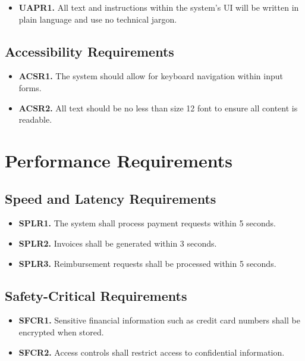\documentclass[12pt]{article}
\begin{document}
\begin{itemize}
    \item \textbf{UAPR1.} All text and instructions within the system's UI will be written in plain language and use no technical jargon.
\end{itemize}

\subsection{Accessibility Requirements}

\label{ACSR}

\begin{itemize}
    \item \textbf{ACSR1.} The system should allow for keyboard navigation within input forms.
    \item \textbf{ACSR2.} All text should be no less than size 12 font to ensure all content is readable.
\end{itemize}

\section{Performance Requirements}
\subsection{Speed and Latency Requirements}

\label{SPLR}

\begin{itemize}
    \item \textbf{SPLR1.} The system shall process payment requests within 5 seconds.
    \item \textbf{SPLR2.} Invoices shall be generated within 3 seconds.
    \item \textbf{SPLR3.} Reimbursement requests shall be processed within 5 seconds.
\end{itemize}

\subsection{Safety-Critical Requirements}

\label{SFCR}

\begin{itemize}
    \item \textbf{SFCR1.} Sensitive financial information such as credit card numbers shall be encrypted when stored.
    \item \textbf{SFCR2.} Access controls shall restrict access to confidential information.
\end{itemize}
\end{document}
